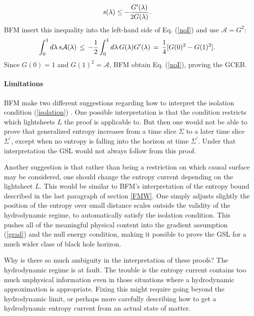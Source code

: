 \documentclass{article}
\begin{document}
\begin{equation}
s(\lambda) \le -{{G^{\prime}(\lambda)}\over{2G(\lambda)}}.
\end{equation}
BFM insert this inequality into the left-hand side of Eq. (\ref{noI}) and use $\mathcal{A} = G^2$:
\begin{equation}
\int_0^1 d\lambda\,s\mathcal{A}(\lambda) \,\le\,
-{1 \over 2}\int_0^1 d\lambda\, G(\lambda)G^{\prime}(\lambda) \,=\,
{1 \over 4}[G(0)^2 - G(1)^2].
\end{equation}
Since $G(0) = 1$ and $G(1)^2 = \mathcal{A}$, BFM obtain Eq. (\ref{noI}), proving the GCEB.

\paragraph{Limitations}

BFM make two different suggestions regarding how to interpret the isolation condition (\ref{isolation}) \cite{BFM03}.  One possible interpretation is that the condition restricts which lightsheets $L$ the proof is applicable to.  But then one would not be able to prove that generalized entropy increases from a time slice $\Sigma$ to a later time slice $\Sigma^{\prime}$, except when no entropy is falling into the horizon at time $\Sigma^{\prime}$.  Under that interpretation the GSL would not always follow from this proof.

Another suggestion is that rather than being a restriction on which causal surface may be considered, one should change the entropy current depending on the lightsheet $L$.  This would be similar to BFM's interpretation of the entropy bound described in the last paragraph of section \ref{FMW}.  One simply adjusts slightly the position of the entropy over small distance scales outside the validity of the hydrodynamic regime, to automatically satisfy the isolation condition.  This pushes all of the meaningful physical content into the gradient assumption (\ref{grad}) and the null energy condition, making it possible to prove the GSL for a much wider class of black hole horizon.

Why is there so much ambiguity in the interpretation of these proofs?  The hydrodynamic regime is at fault.  The trouble is the entropy current contains too much unphysical information even in those situations where a hydrodynamic approximation is appropriate.  Fixing this might require going beyond the hydrodynamic limit, or perhaps more carefully describing how to get a hydrodynamic entropy current from an actual state of matter.
\end{document}
